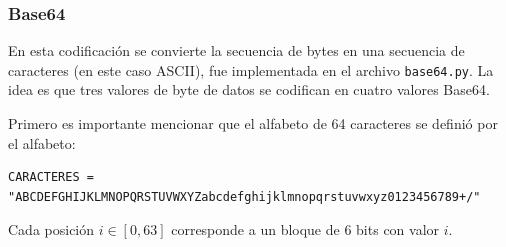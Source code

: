 \documentclass[12pt, a4paper]{article}
\begin{document}
\subsubsection*{Base64}

En esta codificación se convierte la secuencia de bytes en una secuencia de caracteres (en este caso ASCII),
fue implementada en el archivo \texttt{base64.py}. La idea es que tres valores de byte de datos se codifican en
cuatro valores Base64.

Primero es importante mencionar que el alfabeto de 64 caracteres se definió por el alfabeto:

\begin{verbatim}
CARACTERES = "ABCDEFGHIJKLMNOPQRSTUVWXYZabcdefghijklmnopqrstuvwxyz0123456789+/"
\end{verbatim}

Cada posición $i \in [0, 63]$ corresponde a un bloque de 6 bits con valor $i$.
\end{document}
